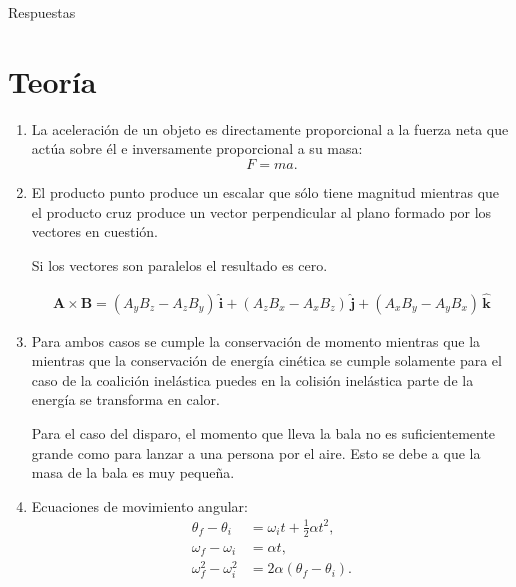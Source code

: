 \documentclass{article}
\begin{document}

\clearpage

\setcounter{section}{0}

\begin{center}
{\sc \huge Respuestas}
\end{center}

\section{Teoría} %
\label{sec:teoria}


\begin{enumerate}
\item La aceleración de un objeto es directamente proporcional a la fuerza neta
que actúa sobre él e inversamente proporcional a su masa:
\begin{equation*}
F=ma.
\end{equation*}

\item El producto punto produce un escalar que sólo tiene magnitud mientras que
el producto cruz produce un vector perpendicular al plano formado por los
vectores en cuestión.

Si los vectores son paralelos el resultado es cero.

\begin{align*}
\mathbf{A} \times \mathbf{B} = 
(A_{y}B_{z} - A_{z}B_{y})\, \mathbf{\hat{i}} + 
(A_{z}B_{x} - A_{x}B_{z})\, \mathbf{\hat{j}} + 
(A_{x}B_{y} - A_{y}B_{x})\, \mathbf{\hat{k}}
\end{align*}

\item Para ambos casos se cumple la conservación de momento mientras que la
mientras que la conservación de energía cinética se cumple solamente para el
caso de la coalición inelástica puedes en la colisión inelástica parte de la
energía se transforma en calor.

Para el caso del disparo, el momento que lleva la bala no es suficientemente
grande como para lanzar a una persona por el aire. Esto se debe a que la masa
de la bala es muy pequeña.

\item Ecuaciones de movimiento angular:
\begin{align}
\theta_{f} - \theta_{i} &= \omega_{i}t + \frac{1}{2}\alpha t^{2}, \\
\omega_{f} - \omega_{i} &= \alpha t, \\
\omega_{f}^{2} - \omega_{i}^{2} &= 2\alpha (\theta_{f} - \theta_{i}).
\end{align}


\end{enumerate}
\end{document}
